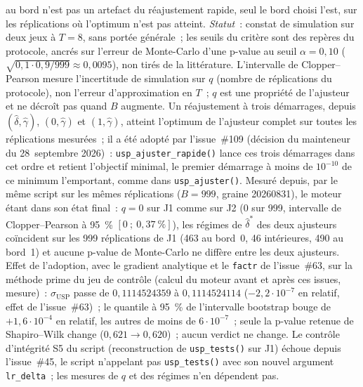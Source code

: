 \documentclass[a4paper,11pt]{article}
\newcommand{\code}[1]{\texttt{\small #1}}
\begin{document}
au bord n'est pas un artefact du réajustement rapide, seul le bord choisi l'est, sur les
réplications où l'optimum n'est pas atteint. \emph{Statut}~: constat de simulation sur deux jeux à $T = 8$, sans portée
générale~; les seuils du critère sont des repères du protocole, ancrés sur l'erreur de
Monte-Carlo d'une p-value au seuil $\alpha = 0{,}10$ ($\sqrt{0{,}1\cdot 0{,}9/999} \approx
0{,}0095$), non tirés de la littérature. L'intervalle de Clopper--Pearson mesure l'incertitude
de simulation sur $q$ (nombre de réplications du protocole), non l'erreur d'approximation en
$T$~; $q$ est une propriété de l'ajusteur et ne décroît pas quand $B$ augmente. Un réajustement
à trois démarrages, depuis $(\hat\delta,\hat\gamma)$, $(0,\hat\gamma)$ et $(1,\hat\gamma)$,
atteint l'optimum de l'ajusteur complet sur toutes les réplications mesurées~; il a été adopté par
l'issue~\#109 (décision du mainteneur du 28~septembre 2026)~: \code{usp\_ajuster\_rapide()}
lance ces trois démarrages dans cet ordre et retient l'objectif minimal, le premier démarrage à
moins de $10^{-10}$ de ce minimum l'emportant, comme dans \code{usp\_ajuster()}. Mesuré depuis,
par le même script sur les mêmes réplications ($B = 999$, graine 20260831), le moteur étant dans
son état final~: $q = 0$ sur J1 comme sur J2 (0 sur 999, intervalle de Clopper--Pearson à 95~\%
$[0~;~0{,}37~\%]$), les régimes de $\hat\delta^{*}$ des deux ajusteurs coïncident sur les 999
réplications de J1 (463 au bord~0, 46 intérieures, 490 au bord~1) et aucune p-value de
Monte-Carlo ne diffère entre les deux ajusteurs. Effet de l'adoption, avec le gradient analytique
et le \code{factr} de l'issue~\#63, sur la méthode prime du jeu de contrôle (calcul du moteur avant
et après ces issues, mesure)~: $\sigma_{\mathrm{USP}}$ passe de $0{,}1114524359$ à
$0{,}1114524114$ ($-2{,}2\cdot 10^{-7}$ en relatif, effet de l'issue~\#63)~; le quantile à
95~\% de l'intervalle bootstrap bouge de $+1{,}6\cdot 10^{-4}$ en relatif, les autres de moins
de $6\cdot 10^{-7}$~; seule la p-value retenue de Shapiro--Wilk change ($0{,}621 \to 0{,}620$)~;
aucun verdict ne change. Le contrôle d'intégrité S5 du script (reconstruction de
\code{usp\_tests()} sur J1) échoue depuis l'issue~\#45, le script n'appelant pas
\code{usp\_tests()} avec son nouvel argument \code{lr\_delta}~; les mesures de $q$ et des
régimes n'en dépendent pas.
\end{document}
